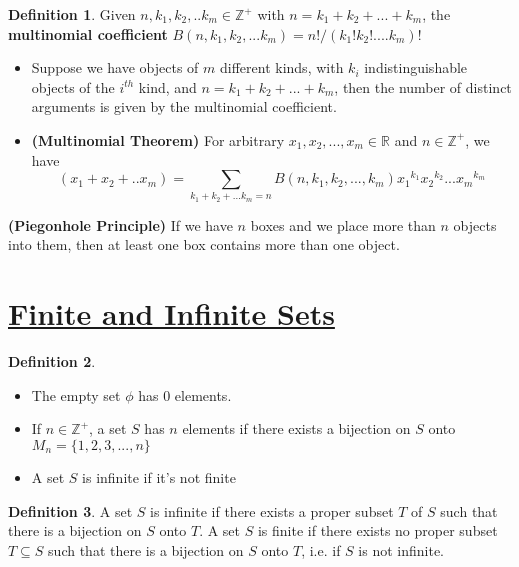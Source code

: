 \documentclass{article}
\theoremstyle{definition}
\newtheorem*{defi}{Definition}
\theoremstyle{definition}
\newenvironment{manualprop}[1]{%
  \renewcommand\themanualpropinner{#1}%
  \manualpropinner
}{\endmanualpropinner}
\theoremstyle{named}
\begin{document}
\begin{defi}
    Given $n, k_1, k_2, .. k_m \in \mathbb{Z^+}$ with $n = k_1+ k_2 + ...+ k_m$, the \textbf{multinomial coefficient} $B(n, k_1, k_2, ... k_m) = n! / (k_1 ! k_2 ! .... k_m) !$ 
\end{defi}

\begin{manualprop} {28}
    \begin{itemize}
        \item Suppose we have objects of $m$ different kinds, with $k_i$ indistinguishable objects of the $i^{th}$ kind, and $n = k_1 + k_2 + ... + k_m$, then the number of distinct arguments is given by the multinomial coefficient.
        \item \textbf{(Multinomial Theorem)} For arbitrary $x_1, x_2, ..., x_m \in \mathbb{R}$ and $n \in \mathbb{Z^+}$, we have $$(x_1 + x_2 + .. x_m) = \sum_{k_1+k_2+...k_m = n} B(n, k_1, k_2, ..., k_m) {x_1}^{k_1} {x_2}^{k_2} ...  {x_m}^{k_m}$$
    \end{itemize}
\end{manualprop}


\begin{manualprop}{29}
    \textbf{(Piegonhole Principle)} If we have $n$
boxes and we place more than $n$ objects into them, then at
least one box contains more than one object.
\end{manualprop}



\section{\underline{Finite and Infinite Sets}}


\begin{defi}
\begin{itemize}
\item The empty set $\phi$ has 0 elements.
\item If $n \in \mathbb{Z^+}$, a set $S$ has $n$ elements if there exists a bijection on $S$ onto $M_n = \{1, 2, 3, ..., n \}$
\item A set $S$ is infinite if it's not finite
\end{itemize}
\end{defi}

\begin{defi}
    A set $S$ is infinite if there exists a
proper subset $T$ of $S$ such that there is a bijection
on $S$ onto $T$. A set $S$ is finite if there exists no
proper subset $T \subseteq S$ such that there is a bijection
on $S$ onto $T$, i.e. if $S$ is not infinite.
\end{defi}
\end{document}
